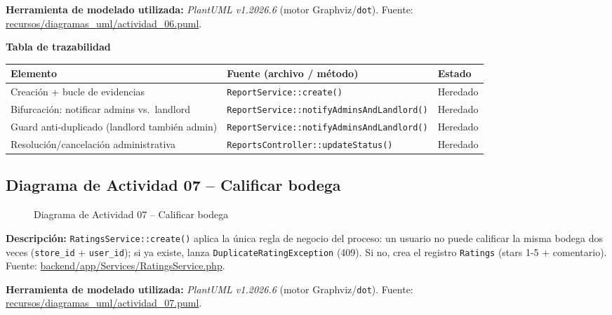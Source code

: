 \bigskip
{\sloppy\noindent\textbf{Herramienta de modelado utilizada:} \textit{PlantUML v1.2026.6} (motor Graphviz/\texttt{dot}). Fuente: \url{recursos/diagramas_uml/actividad_06.puml}.\par}

\bigskip
\noindent\textbf{Tabla de trazabilidad}
\begin{longtable}{|L{4cm}|L{7.5cm}|M{2.3cm}|}
\hline
{} \textbf{Elemento} & \textbf{Fuente (archivo / método)} & \textbf{Estado} \\ \hline
\endhead
Creación + bucle de evidencias & \texttt{ReportService::create()} & Heredado \\ \hline
Bifurcación: notificar admins vs.\ landlord & \texttt{ReportService::notifyAdminsAndLandlord()} & Heredado \\ \hline
Guard anti-duplicado (landlord también admin) & \texttt{ReportService::notifyAdminsAndLandlord()} & Heredado \\ \hline
Resolución/cancelación administrativa & \texttt{ReportsController::updateStatus()} & Heredado \\ \hline
\end{longtable}
\clearpage

\subsection{Diagrama de Actividad 07 -- Calificar bodega}
\begin{figure}[H]
    \centering
    \caption{Diagrama de Actividad 07 -- Calificar bodega}
    \label{fig:actividad07}
\end{figure}

{\sloppy\noindent\textbf{Descripción:} \texttt{RatingsService::create()} aplica la única regla de negocio del proceso: un usuario no puede calificar la misma bodega dos veces (\texttt{store\_id} + \texttt{user\_id}); si ya existe, lanza \texttt{DuplicateRatingException} (409). Si no, crea el registro \texttt{Ratings} (stars 1-5 + comentario). Fuente: \url{backend/app/Services/RatingsService.php}.\par}

\bigskip
{\sloppy\noindent\textbf{Herramienta de modelado utilizada:} \textit{PlantUML v1.2026.6} (motor Graphviz/\texttt{dot}). Fuente: \url{recursos/diagramas_uml/actividad_07.puml}.\par}


